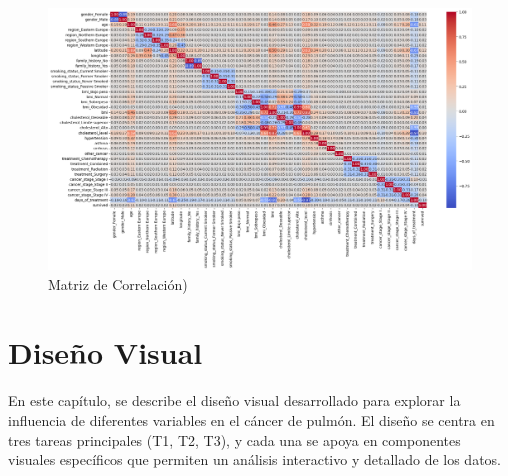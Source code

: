 \documentclass[10pt,journal,compsoc]{IEEEtran}
\begin{document}
\begin{figure}[htb]
    \centering
    \includegraphics[width=\linewidth]{imagenes/MatrixCorrelacion.png}
    \caption{Matriz de Correlación)}
    \label{fig:correlacion}
\end{figure}


\section{Diseño Visual}
En este capítulo, se describe el diseño visual desarrollado para explorar la influencia de diferentes variables en el cáncer de pulmón. El diseño se centra en tres tareas principales (T1, T2, T3), y cada una se apoya en componentes visuales específicos que permiten un análisis interactivo y detallado de los datos.
\end{document}
